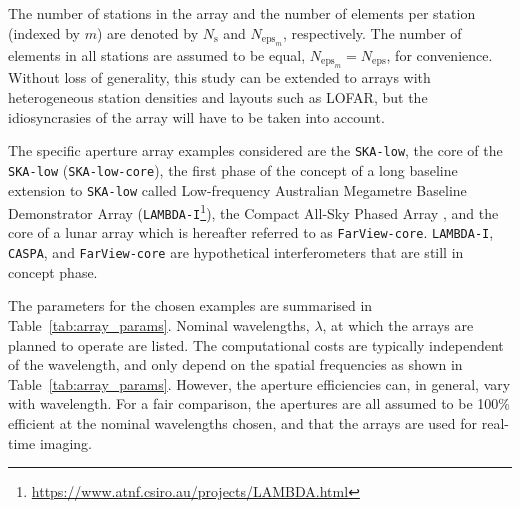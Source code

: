 \documentclass[
  journal=pasa,
  manuscript=article-type,
  year=2020,
  volume=37,
]{cup-journal}
\begin{document}
\begin{figure}
{\label{fig:geometry-notation}}
\end{figure}

The number of stations in the array and the number of elements per station (indexed by $m$) are denoted by $N_\textrm{s}$ and $N_{\textrm{eps}_m}$, respectively. The number of elements in all stations are assumed to be equal, $N_{\textrm{eps}_m} = N_\textrm{eps}$, for convenience. Without loss of generality, this study can be extended to arrays with heterogeneous station densities and layouts such as LOFAR, but the idiosyncrasies of the array will have to be taken into account.

The specific aperture array examples considered are the \texttt{SKA-low}, the core of the \texttt{SKA-low} (\texttt{SKA-low-core}), the first phase of the concept of a long baseline extension to \texttt{SKA-low} called Low-frequency Australian Megametre Baseline Demonstrator Array (\texttt{LAMBDA-I}\footnote{\url{https://www.atnf.csiro.au/projects/LAMBDA.html}}), the Compact All-Sky Phased Array \citep[\texttt{CASPA}\footnote{Presently, CASPA's stations are intended for localisation and astrometry, rather than for aperture synthesis.};][]{Luo+2024}, and the core of a lunar array \citep[\texttt{FarView};][]{Polidan+2024} which is hereafter referred to as \texttt{FarView-core}. \texttt{LAMBDA-I}, \texttt{CASPA}, and \texttt{FarView-core} are hypothetical interferometers that are still in concept phase.

The parameters for the chosen examples are summarised in Table~\ref{tab:array_params}. Nominal wavelengths, $\lambda$, at which the arrays are planned to operate are listed. The computational costs are typically independent of the wavelength, and only depend on the spatial frequencies as shown in Table~\ref{tab:array_params}. However, the aperture efficiencies can, in general, vary with wavelength. For a fair comparison, the apertures are all assumed to be 100\% efficient at the nominal wavelengths chosen, and that the arrays are used for real-time imaging.
\end{document}
